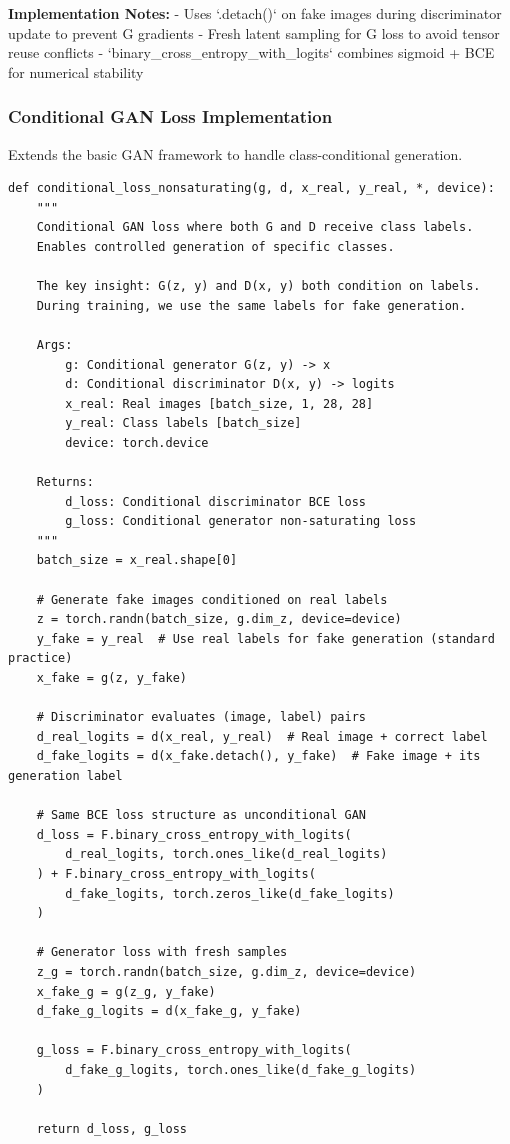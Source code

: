 \documentclass{article}
\begin{document}
\textbf{Implementation Notes:}
- Uses `.detach()` on fake images during discriminator update to prevent G gradients
- Fresh latent sampling for G loss to avoid tensor reuse conflicts
- `binary_cross_entropy_with_logits` combines sigmoid + BCE for numerical stability

\subsubsection{Conditional GAN Loss Implementation}

Extends the basic GAN framework to handle class-conditional generation.

\begin{verbatim}
def conditional_loss_nonsaturating(g, d, x_real, y_real, *, device):
    """
    Conditional GAN loss where both G and D receive class labels.
    Enables controlled generation of specific classes.

    The key insight: G(z, y) and D(x, y) both condition on labels.
    During training, we use the same labels for fake generation.

    Args:
        g: Conditional generator G(z, y) -> x
        d: Conditional discriminator D(x, y) -> logits
        x_real: Real images [batch_size, 1, 28, 28]
        y_real: Class labels [batch_size]
        device: torch.device

    Returns:
        d_loss: Conditional discriminator BCE loss
        g_loss: Conditional generator non-saturating loss
    """
    batch_size = x_real.shape[0]

    # Generate fake images conditioned on real labels
    z = torch.randn(batch_size, g.dim_z, device=device)
    y_fake = y_real  # Use real labels for fake generation (standard practice)
    x_fake = g(z, y_fake)

    # Discriminator evaluates (image, label) pairs
    d_real_logits = d(x_real, y_real)  # Real image + correct label
    d_fake_logits = d(x_fake.detach(), y_fake)  # Fake image + its generation label

    # Same BCE loss structure as unconditional GAN
    d_loss = F.binary_cross_entropy_with_logits(
        d_real_logits, torch.ones_like(d_real_logits)
    ) + F.binary_cross_entropy_with_logits(
        d_fake_logits, torch.zeros_like(d_fake_logits)
    )

    # Generator loss with fresh samples
    z_g = torch.randn(batch_size, g.dim_z, device=device)
    x_fake_g = g(z_g, y_fake)
    d_fake_g_logits = d(x_fake_g, y_fake)

    g_loss = F.binary_cross_entropy_with_logits(
        d_fake_g_logits, torch.ones_like(d_fake_g_logits)
    )

    return d_loss, g_loss
\end{verbatim}
\end{document}
